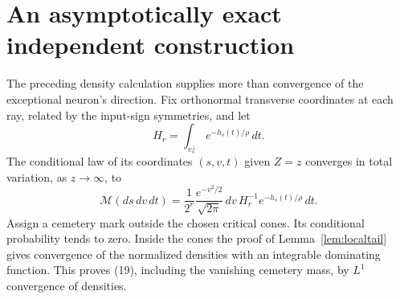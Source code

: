 \section{An asymptotically exact independent construction}
The preceding density calculation supplies more than convergence of the
exceptional neuron's direction. Fix orthonormal transverse coordinates
at each ray, related by the input-sign symmetries, and let
\[
 H_r=\int_{v_s^\perp}e^{-h_s(t)/\rho}\,dt.
\]
The conditional law of its coordinates $(s,v,t)$ given $Z=z$ converges
in total variation, as $z\to\infty$, to
\[
 \mathcal M(ds\,dv\,dt)
 =\frac1{2^r}\frac{e^{-v^2/2}}{\sqrt{2\pi}}\,dv\,
                         H_r^{-1}e^{-h_s(t)/\rho}\,dt.    \tag{19}
\]
Assign a cemetery mark outside the chosen critical cones. Its conditional
probability tends to zero. Inside the cones the proof of
Lemma~\ref{lem:localtail} gives convergence of the normalized densities
with an integrable dominating function. This proves (19), including the
vanishing cemetery mass, by $L^1$ convergence of densities.


